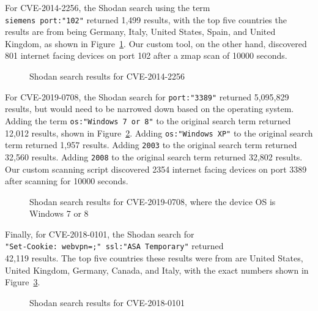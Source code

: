 For CVE-2014-2256, the Shodan search using the term \\\verb|siemens port:"102"| returned
1,499 results, with the top five countries the results are from being
Germany, Italy, United States, Spain, and United Kingdom, as shown in
Figure~\ref{fig:shodan-siemens}. Our custom tool, on the other hand,
discovered 801 internet facing devices on port 102 after a zmap scan of 10000
seconds.

\begin{figure}[!h]
\begin{center}
\caption{Shodan search results for CVE-2014-2256}
\label{fig:shodan-siemens}
\end{center}
\end{figure}

For CVE-2019-0708, the Shodan search for \verb|port:"3389"| returned
5,095,829 results, but would need to be narrowed down based on the operating
system. Adding the term \verb|os:"Windows 7 or 8"| to the original search term returned
12,012 results, shown in Figure~\ref{fig:shodan-windows-78}. Adding
\verb|os:"Windows XP"| to the original search term
returned 1,957 results. Adding \verb|2003| to the original search term returned
32,560 results. Adding \verb|2008| to the original search term returned 32,802
results. Our custom scanning script discovered 2354 internet facing devices on
port 3389 after scanning for 10000 seconds.

\begin{figure}[!h]
\begin{center}
\caption{Shodan search results for CVE-2019-0708, where the device OS is Windows 7 or 8}
\label{fig:shodan-windows-78}
\end{center}
\end{figure}

Finally, for CVE-2018-0101, the Shodan search for\\
\verb|"Set-Cookie: webvpn=;" ssl:"ASA Temporary"| returned\\42,119 results.
The top five countries these results were from are United States, United Kingdom,
Germany, Canada, and Italy, with the exact numbers shown in
Figure~\ref{fig:shodan-cisco}.

\begin{figure}[!h]
\begin{center}
\caption{Shodan search results for CVE-2018-0101}
\label{fig:shodan-cisco}
\end{center}
\end{figure}
